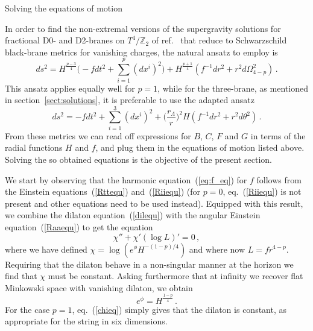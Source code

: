 \documentclass[a4paper,11pt]{article}
\makeatletter
\renewcommand{\subsection}{\@startsection{subsection}{2}{\z@} {-3.25ex
plus -1ex minus -.2ex}{1.5ex plus .2ex}{\normalsize\bf}}
\newcommand{\eqref}[1]{(\ref{#1})}
\newcommand{\ZZ}{\mathbb{Z}}  \newcommand{\Zint}{\mathbb{Z}}
\makeatother
\begin{document}
\subsection{Solving the equations of motion}
\label{subsect:solving}

In order to find the non-extremal versions of the supergravity
solutions for fractional D0- and D2-branes on $T^4\!/\ZZ_2$ of
ref.~\cite{Frau:2000gk} that reduce to Schwarz\-schild black-brane
metrics for vanishing charges, the natural ansatz to employ is
%
\begin{equation}
\label{our_ansatz}
ds^2 = H^{\frac{p-3}{4}} \Big( - f dt^2 + \sum_{i=1}^p (dx^i)^2 \Big)
    + H^{\frac{p+1}{4}} \left( f^{-1}dr^2 + r^2 d\Omega_{4-p}^2
    \right)\,.
\end{equation}
%
This ansatz applies equally well for $p=1$, while for the three-brane,
as mentioned in section~\ref{sect:solutions}, it is preferable to use
the adapted ansatz
\begin{equation}
\label{our_ansatz3}
ds^2 = - f dt^2 + \sum_{i=1}^3 (dx^i)^2 +
 \Big(\frac{r_\Lambda}{r}\Big)^2 H \left( f^{-1}dr^2 + r^2 d\theta^2
 \right) \,.
\end{equation}
%
From these metrics we can read off expressions for $B$, $C$, $F$ and
$G$ in terms of the radial functions $H$ and $f$, and plug them in the
equations of motion listed above. Solving the so obtained equations is
the objective of the present section.

We start by observing that the harmonic equation~\eqref{eq:f_eq} for
$f$ follows from the Einstein equations~\eqref{Rttequ}
and~\eqref{Riiequ} (for $p=0$, eq.~\eqref{Riiequ} is not present and
other equations need to be used instead). Equipped with this result,
we combine the dilaton equation~\eqref{dilequ} with the angular
Einstein equation~\eqref{Raaequ} to get the equation
%
\begin{equation}
\label{chieq}
\chi'' + \chi' (\log L)' = 0 \,,
\end{equation}
%
where we have defined $\chi = \log(e^\phi H^{-(1-p)/4})$ and where now
$L=fr^{4-p}$. Requiring that the dilaton behave in a non-singular
manner at the horizon we find that $\chi$ must be constant. Asking
furthermore that at infinity we recover flat Minkowski space with
vanishing dilaton, we obtain
%
\begin{equation}
\label{phiHrelp}
e^\phi = H^{\frac{1-p}{4}} \,.
\end{equation}
%
For the case $p=1$, eq.~\eqref{chieq} simply gives that the dilaton is
constant, as appropriate for the string in six dimensions.
\end{document}
